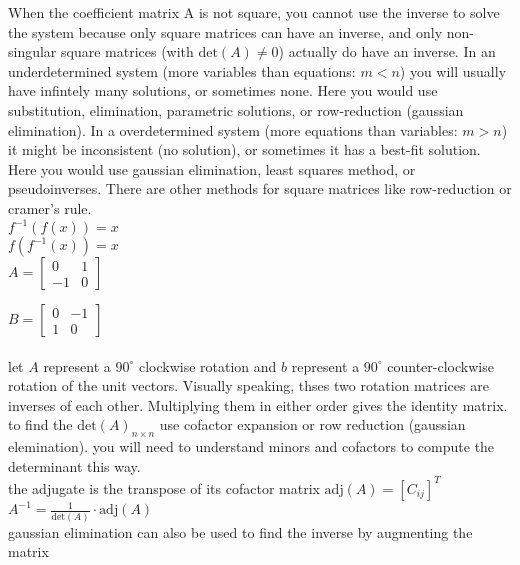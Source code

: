 \documentclass{article}
\begin{document}
When the coefficient matrix A is not square, you cannot use the inverse to solve the system because only square matrices can have an inverse, and only non-singular square matrices (with $\text{det}(A) \neq 0$) actually do have an inverse. In an underdetermined system (more variables than equations: $m < n$) you will usually have infintely many solutions, or sometimes none. Here you would use substitution, elimination, parametric solutions, or row-reduction (gaussian elimination). In a overdetermined system (more equations than variables: $m > n$) it might be inconsistent (no solution), or sometimes it has a best-fit solution. Here you would use gaussian elimination, least squares method, or pseudoinverses. There are other methods for square matrices like row-reduction or cramer's rule.\\

$f^{-1}(f(x)) = x$\\
$f(f^{-1}(x)) = x$\\

$A =
\begin{bmatrix}
0 & 1\\
-1 & 0
\end{bmatrix}
$

$B =
\begin{bmatrix}
0 & -1\\
1 & 0
\end{bmatrix}
$\\\\

let $A$ represent a $90^{\circ}$ clockwise rotation and $b$ represent a $90^{\circ}$ counter-clockwise rotation of the unit vectors. Visually speaking, thses two rotation matrices are inverses of each other. Multiplying them in either order gives the identity matrix.\\

to find the $\text{det}(A)_{n \times n}$ use cofactor expansion or row reduction (gaussian elemination). you will need to understand minors and cofactors to compute the determinant this way.\\

the adjugate is the transpose of its cofactor matrix $\text{adj}(A) = [C_{ij}]^T$\\

$A^{-1} = \frac{1}{\text{det}(A)} \cdot \text{adj}(A)$\\

gaussian elimination can also be used to find the inverse by augmenting the matrix\\
\end{document}
